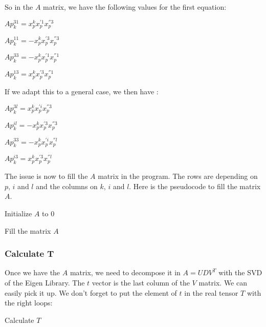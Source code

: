 \documentclass{report}
\begin{document}
So in the $A$ matrix, we have the following values for the first equation: 
\begin{center}
$Ap_{k}^{31} = x_{p}^{k}x_{p}^{'1}x_{p}^{''3}$
\end{center}
\begin{center}
$Ap_{k}^{11} = - x_{p}^{k}x_{p}^{'3}x_{p}^{''3}$
\end{center}
\begin{center}
$Ap_{k}^{33} = -x_{p}^{k} x_{p}^{'1}x_{p}^{''1}$
\end{center}
\begin{center}
$Ap_{k}^{13} = x_{p}^{k}x_{p}^{'3}x_{p}^{''1}$
\end{center}

If we adapt this to a general case, we then have  : 
\begin{center}
$Ap_{k}^{3l} = x_{p}^{k}x_{p}^{'i}x_{p}^{''3}$
\end{center}
\begin{center}
$Ap_{k}^{il} = - x_{p}^{k}x_{p}^{'3}x_{p}^{''3}$
\end{center}
\begin{center}
$Ap_{k}^{33} = -x_{p}^{k} x_{p}^{'i}x_{p}^{''l}$
\end{center}
\begin{center}
$Ap_{k}^{i3} = x_{p}^{k}x_{p}^{'3}x_{p}^{''l}$
\end{center}


The issue is now to fill the $A$ matrix in the program. The rows are depending on $p$, $i$ and $l$ and the columns on $k$, $i$ and $l$. Here is the pseudocode to fill the matrix $A$. 

Initialize $A$ to 0
\begin{algorithm}
\SetLine
\caption{Fill the matrix $A$}
\SetLine
{}
\end{algorithm}
\subsubsection{Calculate T}
Once we have the $A$ matrix, we need to decompose it in $A=UDV^{T}$ with the SVD of the Eigen Library. The $t$ vector is the last column of the $V$ matrix. We can easily pick it up. 
We don't forget to put the element of $t$ in the real tensor $T$ with the right loops: 
\begin{algorithm}
\SetLine
\caption{Calculate $T$}
\SetLine
{}
\end{algorithm}
\end{document}
